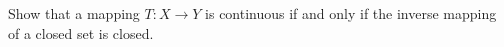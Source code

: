 Show that a mapping $T:X\to Y$ is continuous if and only if the inverse mapping of a closed set is
closed.\\